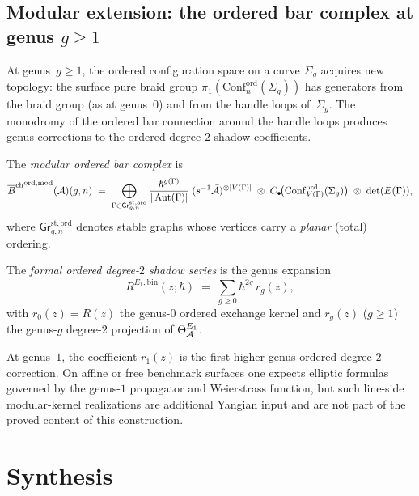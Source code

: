 \subsection{Modular extension: the ordered bar complex at
genus $g\ge 1$}

\begin{construction}
At genus~$g\ge 1$, the ordered configuration space on a curve
$\Sigma_g$ acquires new topology: the surface pure braid group
$\pi_1(\mathrm{Conf}_n^{\mathrm{ord}}(\Sigma_g))$ has generators
from the braid group (as at genus~$0$) and from the handle
loops of~$\Sigma_g$. The monodromy of the ordered bar connection
around the handle loops produces genus corrections to the ordered
degree-$2$ shadow coefficients.

The \emph{modular ordered bar complex} is
\[
{\overline{B}^{\mathrm{ch}}}^{\mathrm{ord,mod}}(\mathcal{A})(g,n)
\;=\;
\bigoplus_{\Gamma\in\mathsf{Gr}^{\mathrm{st,ord}}_{g,n}}
\frac{\hbar^{g(\Gamma)}}{|\operatorname{Aut}(\Gamma)|}
\;(s^{-1}\bar{\mathcal{A}})^{\otimes|V(\Gamma)|}
\;\otimes\;
C_\bullet\!\bigl(
\mathrm{Conf}^{\mathrm{ord}}_{V(\Gamma)}(\Sigma_g)\bigr)
\;\otimes\;\det(E(\Gamma)),
\]
where $\mathsf{Gr}^{\mathrm{st,ord}}_{g,n}$ denotes stable
graphs whose vertices carry a \emph{planar} (total) ordering.

The \emph{formal ordered degree-$2$ shadow series} is the genus expansion
\begin{equation}%
R^{E_1,\mathrm{bin}}(z;\hbar)
\;=\;
\sum_{g\ge 0}\hbar^{2g}\,r_g(z),
\end{equation}
with $r_0(z)=R(z)$ the genus-$0$ ordered exchange kernel and
$r_g(z)$ ($g\ge 1$) the genus-$g$ degree-$2$ projection of
$\Theta_{\mathcal{A}}^{E_1}$.

At genus~$1$, the coefficient $r_1(z)$ is the first higher-genus
ordered degree-$2$ correction. On affine or free benchmark surfaces
one expects elliptic formulas governed by the genus-$1$ propagator and
Weierstrass function, but such line-side modular-kernel realizations
are additional Yangian input and are not part of the proved content of
this construction.
\end{construction}

\section{Synthesis}
\label{sec:v2-oackd-supplement}

